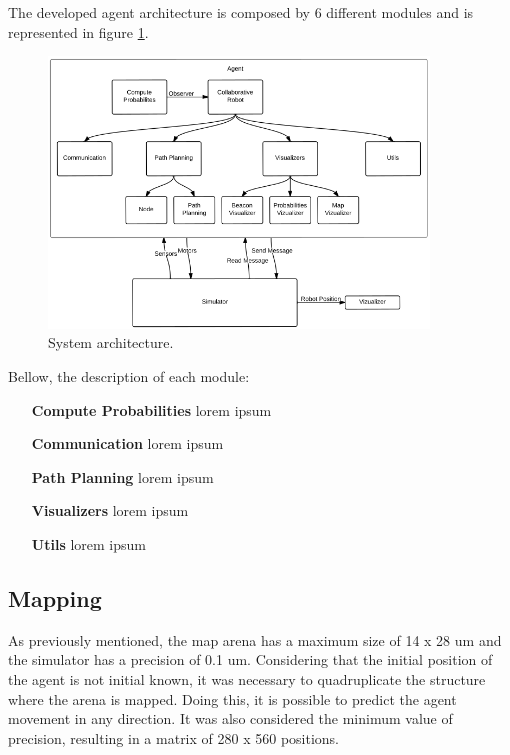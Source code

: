 \documentclass[oribibl]{llncs}
\begin{document}
The developed agent architecture is composed by 6 different modules and is represented in figure \ref{fig:robot-arch}.

\begin{figure}
  \centering
  \includegraphics[width=0.9\textwidth]{robot-architecture.png}
  \caption{System architecture.}
  \label{fig:robot-arch}
\end{figure}

Bellow, the description of each module:

\begin{itemize}
  \item[\textbf{Compute Probabilities}]
  lorem ipsum
  \item[\textbf{Communication}]
  lorem ipsum
  \item[\textbf{Path Planning}]
  lorem ipsum
  \item[\textbf{Visualizers}]
  lorem ipsum
  \item[\textbf{Utils}]
  lorem ipsum
\end{itemize}

\subsection{Mapping}

As previously mentioned, the map arena has a maximum size of 14 x 28 um and the simulator has a precision of 0.1 um. Considering that the initial position of the agent is not initial known, it was necessary to quadruplicate the structure where the arena is mapped. Doing this, it is possible to predict the agent movement in any direction. It was also considered the minimum value of precision, resulting in a matrix of 280 x 560 positions. 
\end{document}
